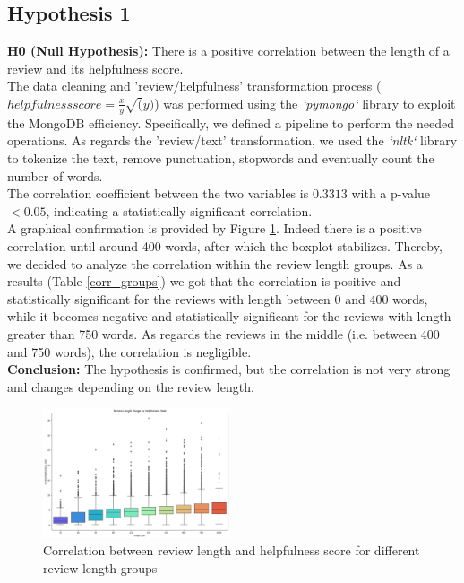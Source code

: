 \subsection*{Hypothesis 1}

\textbf{H0 (Null Hypothesis):} There is a positive correlation between the length of a review and its helpfulness score.\\

The data cleaning and 'review/helpfulness' transformation process ($helpfulness score = \frac{x}{y} \sqrt(y)$) was performed using the \textit{`pymongo`} library to exploit the 
MongoDB efficiency. Specifically, we defined a pipeline to perform the needed operations. As regards the 
'review/text' transformation, we used the \textit{`nltk`} library to tokenize the text, remove punctuation, stopwords and eventually
count the number of words.\\
The correlation coefficient between the two variables is $0.3313$ with a p-value $<0.05$, indicating a statistically significant correlation.\\
A graphical confirmation is provided by Figure \ref{fig:h1_boxplot}. Indeed there is a positive correlation until around 400 words, after which the
boxplot stabilizes. Thereby, we decided to analyze the correlation within the review length groups. As a results (Table \ref{corr_groups}) we got that the correlation is
positive and statistically significant for the reviews with length between 0 and 400 words, while it becomes negative and statistically significant
for the reviews with length greater than 750 words. As regards the reviews in the middle (i.e. between 400 and 750 words), the correlation is negligible.\\
\textbf{Conclusion:} The hypothesis is confirmed, but the correlation is not very strong and changes depending on the review length.\\

\begin{figure}[H]
    \centering
    \includegraphics[width=0.49\textwidth]{./figures/h1_boxplot.png}
    \caption{Correlation between review length and helpfulness score for different review length groups}
    \label{fig:h1_boxplot}
\end{figure}

